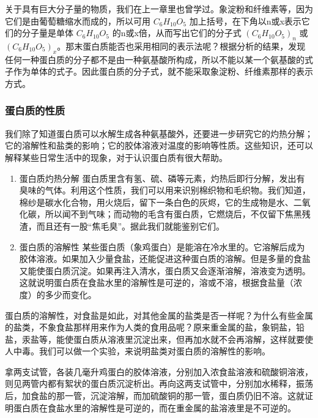 关于具有巨大分子量的物质，我们在上一章里也曾学过。象淀粉和纤维素等，因为它们是由葡萄糖缩水而成的，所以可用
\(C_{6}H_{10}O_{5}\) 加上括号，在下角以n或x表示它们的分子量是单体
\(C_{6}H_{10}O_{5}\) 的n或x倍，从而写出它们的分子式
\((C_{6}H_{10}O_{5})_{n}\) 或
\((C_{6}H_{10}O_{5})_{x}\)。那末蛋白质能否也采用相同的表示法呢？根据分析的结果，发现任何一种蛋白质的分子都不是由一种氨基酸所构成，所以不能以某一个氨基酸的式子作为单体的式子。因此蛋白质的分子式，就不能采取象淀粉、纤维素那样的表示方式。

\subsubsection{蛋白质的性质}

我们除了知道蛋白质可以水解生成各种氨基酸外，还要进一步研究它的灼热分解；它的溶解性和盐类的影响；它的胶体溶液对温度的影响等性质。这些知识，还可以解释某些日常生活中的现象，对于认识蛋白质有很大帮助。

\begin{enumerate}
\item
  蛋白质灼热分解
  蛋白质里含有氢、硫、磷等元素，灼热后即行分解，发出有臭味的气体。利用这个性质，我们可以用来识别棉织物和毛织物。我们知道，棉纱是碳水化合物，用火烧后，留下一条白色的灰烬，它的生成物是水、二氧化碳，所以闻不到气味；而动物的毛含有蛋白质，它燃烧后，不仅留下焦黑残渣，而且还有一股``焦毛臭''。据此我们就能鉴别它们。
\item
  蛋白质的溶解性
  某些蛋白质（象鸡蛋白）是能溶在冷水里的。它溶解后成为胶体溶液。如果加入少量食盐，还能促进这种蛋白质的溶解。但是多量的食盐又能使蛋白质沉淀。如果再注入清水，蛋白质又会逐渐溶解，溶液变为透明。这就说明蛋白质在食盐水里的溶解性是可逆的，溶或不溶，根据食盐量（浓度）的多少而变化。
\end{enumerate}

蛋白质的溶解性，对食盐是如此，对其他金属的盐类是否一样呢？为什么有些金属的盐类，不象食盐那样用来作为人类的食用品呢？原来重金属的盐，象铜盐，铅盐，汞盐等，能使蛋白质从溶液里沉淀出来，但再加水就不会再溶解，这样就要使人中毒。我们可以做一个实验，来说明盐类对蛋白质的溶解性的影响。

拿两支试管，各装几毫升鸡蛋白的胶体溶液，分别加入浓食盐溶液和硫酸铜溶液，则见两管内都有絮状的蛋白质沉淀析出。再向这两支试管中，分别加水稀释，振荡后，加食盐的那一管，沉淀溶解，而加硫酸铜的那一管，蛋白质仍旧不溶。这就证明蛋白质在食盐水里的溶解性是可逆的，而在重金属的盐溶液里是不可逆的。

